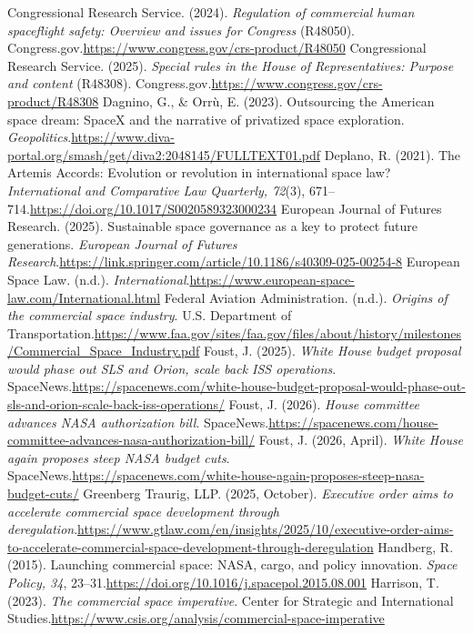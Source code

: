 \begin{referencelist}
   Congressional Research Service. (2024). \emph{Regulation of commercial human spaceflight safety: Overview and issues for Congress} (R48050). Congress.gov.\url{https://www.congress.gov/crs-product/R48050}
   Congressional Research Service. (2025). \emph{Special rules in the House of Representatives: Purpose and content} (R48308). Congress.gov.\url{https://www.congress.gov/crs-product/R48308}
   Dagnino, G., \& Orrù, E. (2023). Outsourcing the American space dream: SpaceX and the narrative of privatized space exploration. \emph{Geopolitics}.\url{https://www.diva-portal.org/smash/get/diva2:2048145/FULLTEXT01.pdf}
   Deplano, R. (2021). The Artemis Accords: Evolution or revolution in international space law? \emph{International and Comparative Law Quarterly, 72}(3), 671–714.\url{https://doi.org/10.1017/S0020589323000234}
   European Journal of Futures Research. (2025). Sustainable space governance as a key to protect future generations. \emph{European Journal of Futures Research}.\url{https://link.springer.com/article/10.1186/s40309-025-00254-8}
   European Space Law. (n.d.). \emph{International}.\url{https://www.european-space-law.com/International.html}
   Federal Aviation Administration. (n.d.). \emph{Origins of the commercial space industry}. U.S. Department of Transportation.\url{https://www.faa.gov/sites/faa.gov/files/about/history/milestones/Commercial_Space_Industry.pdf}
   Foust, J. (2025). \emph{White House budget proposal would phase out SLS and Orion, scale back ISS operations}. SpaceNews.\url{https://spacenews.com/white-house-budget-proposal-would-phase-out-sls-and-orion-scale-back-iss-operations/}
   Foust, J. (2026). \emph{House committee advances NASA authorization bill}. SpaceNews.\url{https://spacenews.com/house-committee-advances-nasa-authorization-bill/}
   Foust, J. (2026, April). \emph{White House again proposes steep NASA budget cuts}. SpaceNews.\url{https://spacenews.com/white-house-again-proposes-steep-nasa-budget-cuts/}
   Greenberg Traurig, LLP. (2025, October). \emph{Executive order aims to accelerate commercial space development through deregulation}.\url{https://www.gtlaw.com/en/insights/2025/10/executive-order-aims-to-accelerate-commercial-space-development-through-deregulation}
   Handberg, R. (2015). Launching commercial space: NASA, cargo, and policy innovation. \emph{Space Policy, 34}, 23–31.\url{https://doi.org/10.1016/j.spacepol.2015.08.001}
   Harrison, T. (2023). \emph{The commercial space imperative}. Center for Strategic and International Studies.\url{https://www.csis.org/analysis/commercial-space-imperative}

\end{referencelist}
